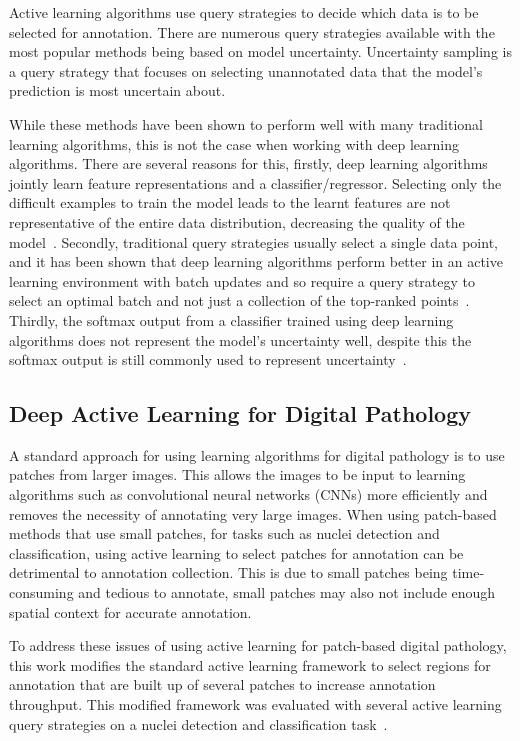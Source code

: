 Active learning algorithms use query strategies to decide which data is to be selected for annotation. There are numerous query strategies available with the most popular methods being based on model uncertainty. Uncertainty sampling is a query strategy that focuses on selecting unannotated data that the model’s prediction is most uncertain about.

While these methods have been shown to perform well with many traditional learning algorithms, this is not the case when working with deep learning algorithms. There are several reasons for this, firstly, deep learning algorithms jointly learn feature representations and a classifier/regressor. Selecting only the difficult examples to train the model leads to the learnt features are not representative of the entire data distribution, decreasing the quality of the model~\citep{wang2016cost}. Secondly, traditional query strategies usually select a single data point, and it has been shown that deep learning algorithms perform better in an active learning environment with batch updates and so require a query strategy to select an optimal batch and not just a collection of the top-ranked points~\citep{sener2017active}. Thirdly, the softmax output from a classifier trained using deep learning algorithms does not represent the model’s uncertainty well, despite this the softmax output is still commonly used to represent uncertainty~\citep{gal2016dropout}.

\subsection{Deep Active Learning for Digital Pathology}
A standard approach for using learning algorithms for digital pathology is to use patches from larger images. This allows the images to be input to learning algorithms such as convolutional neural networks (CNNs) more efficiently and removes the necessity of annotating very large images. When using patch-based methods that use small patches, for tasks such as nuclei detection and classification, using active learning to select patches for annotation can be detrimental to annotation collection. This is due to small patches being time-consuming and tedious to annotate, small patches may also not include enough spatial context for accurate annotation.

To address these issues of using active learning for patch-based digital pathology, this work modifies the standard active learning framework to select regions for annotation that are built up of several patches to increase annotation throughput. This modified framework was evaluated with several active learning query strategies on a nuclei detection and classification task~\citep{sirinukunwattana2016locality}.



